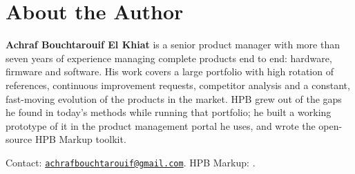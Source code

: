 \section*{About the Author}
{}
\label{sec:author}

\noindent\textbf{Achraf Bouchtarouif El Khiat} is a senior product manager
with more than seven years of experience managing complete products end to
end: hardware, firmware and software. His work covers a large portfolio
with high rotation of references, continuous improvement requests,
competitor analysis and a constant, fast-moving evolution of the products
in the market. HPB grew out of the gaps he found in today's methods while
running that portfolio; he built a working prototype of it in the
product management portal he uses, and wrote the open-source HPB Markup
toolkit.

\medskip
\noindent Contact:
\href{mailto:achrafbouchtarouif@gmail.com}{\texttt{achrafbouchtarouif@gmail.com}}.
HPB Markup: \hpbrepo.
